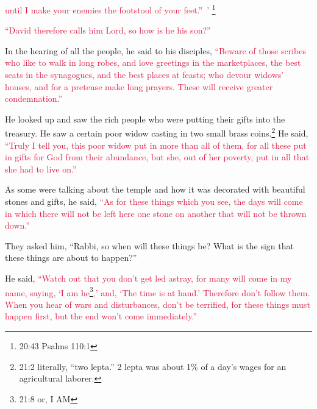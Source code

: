 \myverse{}\textcolor{crimson}{until I make your enemies the footstool of your
	feet.” ’}
\footnote{ 20:43 Psalms 110:1}

\myverse{}\textcolor{crimson}{“David therefore calls him Lord, so how is he his son?”}

\myverse{}In the hearing of all the people, he said to his disciples,
\myverse{}\textcolor{crimson}{“Beware of those scribes who like to walk in long robes, and love greetings
	in the marketplaces, the best seats in the synagogues, and the best places at feasts;
}
\myverse{}\textcolor{crimson}{who devour widows’ houses, and for a pretense make long prayers. These
	will receive greater condemnation.”}


\mychapter{} \myverse*{}He looked up and saw the rich people who were putting their gifts
into the treasury.
\myverse{}He saw a certain poor widow casting in two small brass coins.\footnote{21:2 literally, “two lepta.” 2 lepta was about 1\% of a day’s wages for an agricultural laborer.}
\myverse{}He said,
\textcolor{crimson}{“Truly I tell you, this poor widow put in more than all of them,
}
\myverse{}\textcolor{crimson}{for all these put in gifts for God from their abundance, but she, out of
	her poverty, put in all that she had to live on.”}

\myverse{}As some were talking about the temple and how it was decorated
with beautiful stones and gifts, he said,
\myverse{}\textcolor{crimson}{“As for these things which you see, the days will come in which there will
	not be left here one stone on another that will not be thrown down.”}

\myverse{}They asked him, “Rabbi, so when will these things be? What is
the sign that these things are about to happen?”

\myverse{}He said,
\textcolor{crimson}{“Watch out that you don’t get led astray, for many will come in my name, saying, ‘I am he}\footnote{21:8 or, I AM}\textcolor{crimson}{,’ and, ‘The time is at hand.’ Therefore don’t follow them.
}
\myverse{}\textcolor{crimson}{When you hear of wars and disturbances, don’t be terrified, for these things
	must happen first, but the end won’t come immediately.”}

